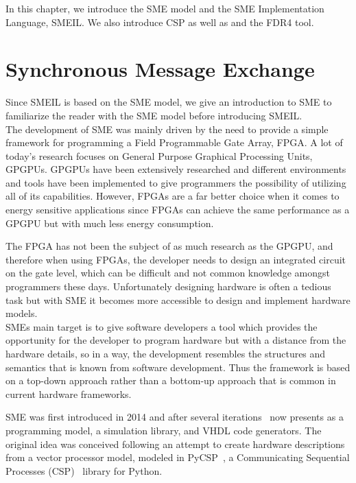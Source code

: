 In this chapter, we introduce the SME model and the SME Implementation Language, SMEIL. We also introduce CSP as well as \cspm{} and the FDR4 tool.

\section{Synchronous Message Exchange}
Since SMEIL is based on the SME model, we give an introduction to SME to familiarize the reader with the SME model before introducing SMEIL.
\\

The development of SME was mainly driven by the need to provide a simple framework for programming a Field Programmable Gate
Array, FPGA. A lot of today's research focuses on General Purpose Graphical Processing Units, GPGPUs. GPGPUs have been extensively researched and different environments and tools have been implemented to give programmers the possibility of utilizing all of its capabilities. However, FPGAs are a far better choice when it comes to energy sensitive applications since FPGAs can achieve the same performance as a GPGPU but with much less energy consumption.

The FPGA has not been the subject of as much research as the GPGPU, and therefore when using FPGAs, the developer needs to design an integrated circuit on the gate level, which can be difficult and not common knowledge amongst programmers these days.
Unfortunately designing hardware is often a tedious task but with SME it becomes more accessible to design and implement hardware models.\\

SMEs main target is to give software developers a tool which provides the opportunity for the developer to program hardware but with a distance from the hardware details, so in a way, the development resembles the structures and semantics that is known from software development.
Thus the framework is based on a top-down approach rather than a bottom-up approach that is common in current hardware frameworks.

SME was first introduced in 2014 and after several iterations~\cite{Vinter2014, Vinter2015, Skovhede} now presents as a programming model, a simulation library, and VHDL code generators. The original idea was conceived following an attempt to create hardware descriptions from a vector processor model, modeled in PyCSP~\cite{bjorndalen2007pycsp, vinter2009pycsp},
a Communicating Sequential Processes (CSP)~\cite{Hoare1978} library for Python.\\

